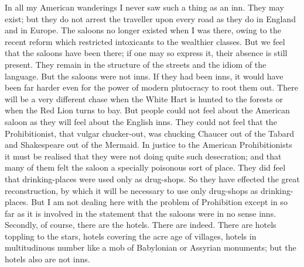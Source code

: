 \documentclass{book}
\begin{document}
In all my American wanderings I never saw such a thing as an inn. They may exist; but they do not arrest the traveller upon every road as they do in England and in Europe. The saloons no longer existed when I was there, owing to the recent reform which restricted intoxicants to the wealthier classes. But we feel that the saloons have been there; if one may so express it, their absence is still present. They remain in the structure of the streets and the idiom of the language. But the saloons were not inns. If they had been inns, it would have been far harder even for the power of modern plutocracy to root them out. There will be a very different chase when the White Hart is hunted to the forests or when the Red Lion turns to bay. But people could not feel about the American saloon as they will feel about the English inns. They could not feel that the Prohibitionist, that vulgar chucker-out, was chucking Chaucer out of the Tabard and Shakespeare out of the Mermaid. In justice to the American Prohibitionists it must be realised that they were not doing quite such desecration; and that many of them felt the saloon a specially poisonous sort of place. They did feel that drinking-places were used only as drug-shops. So they have effected the great reconstruction, by which it will be necessary to use only drug-shops as drinking-places. But I am not dealing here with the problem of Prohibition except in so far as it is involved in the statement that the saloons were in no sense inns. Secondly, of course, there are the hotels. There are indeed. There are hotels toppling to the stars, hotels covering the acre age of villages, hotels in multitudinous number like a mob of Babylonian or Assyrian monuments; but the hotels also are not inns.
\end{document}
